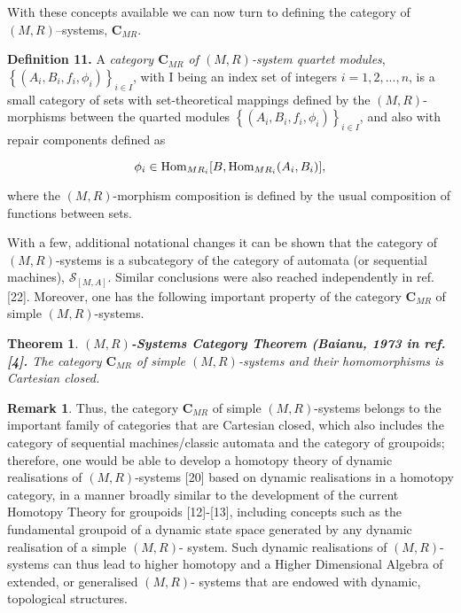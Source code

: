 \documentclass[12pt]{article}
\theoremstyle{plain}
\newtheorem{theorem}{Theorem}[section]
\theoremstyle{definition}
\newtheorem{remark}{Remark}[section]
\numberwithin{equation}{section}
\newcommand{\Hom}{{\rm Hom}}
\begin{document}
With these concepts available we can now turn to defining the category of  $(M,R)$--systems, $\textbf{C}_{MR}$.
\bigbreak

\textbf{Definition 11.}
A \emph{category $\textbf{C}_{MR}$  of $(M,R)$-system quartet modules}, \\
 $\left\{(A_i, B_i, f_i, \phi_i)\right\}_{i \in I}$, with I being an index set of integers $i=1,2,..., n$,
is a small category of sets with set-theoretical mappings defined by the $(M,R)$-morphisms between the quarted modules
$\left\{(A_i, B_i, f_i, \phi_i)\right\}_{i \in I}$, and also with repair components defined as

$$\phi_i \in \Hom_{MR_i}[B, \Hom_{MR_i}(A_i,B_i)],$$

where the $(M,R)$-morphism composition is defined by the usual composition of functions between sets.



With a few, additional notational changes it can be shown that the category of $(M,R)$-systems is a subcategory of the category of automata (or sequential machines), $\mathcal{S}_{[M,A]}$. Similar conclusions were also reached independently in ref. [22].  Moreover, one has the following important property of the category  $\textbf{C}_{MR}$ of
simple  $(M,R)$-systems.

\begin{theorem} {\rm{\textbf{ $(M,R)$-Systems Category Theorem (Baianu, 1973 in ref. [4].} }}
The category $\textbf{C}_{MR}$ of simple  $(M,R)$-systems and their homomorphisms is Cartesian closed.
\end{theorem}

\begin{remark}
Thus, the category $\textbf{C}_{MR}$ of simple  $(M,R)$-systems belongs to the important family of categories that are Cartesian closed, which also includes the category of sequential machines/classic automata and the category of groupoids; therefore, one would be able to develop a homotopy theory of dynamic realisations of $(M,R)$-systems [20] based on dynamic realisations in a homotopy category, in a manner broadly similar to the development of the current Homotopy Theory for groupoids [12]-[13], including concepts such as the fundamental groupoid of a dynamic state space generated by any dynamic realisation of a simple $(M,R)$- system. Such dynamic realisations of  $(M,R)$-systems can thus lead to higher homotopy and a Higher Dimensional Algebra of extended, or generalised $(M,R)$- systems that are endowed with dynamic, topological structures. 
\end{remark}
\end{document}
